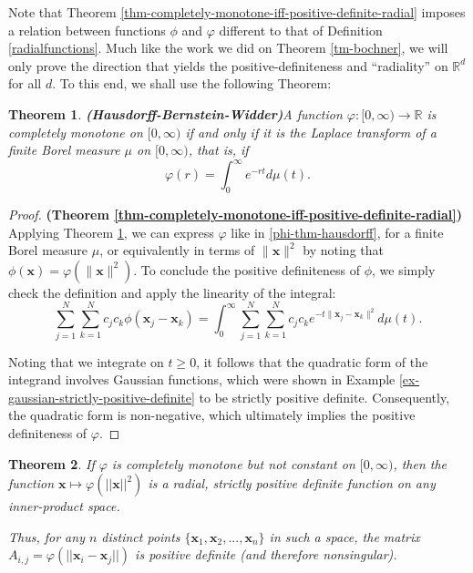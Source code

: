 \documentclass[12pt]{report} %
\newtheorem{theorem}{Theorem}
\newcommand{\tmmathbf}[1]{\ensuremath{\boldsymbol{#1}}}
\newcommand{\tmstrong}[1]{\textbf{#1}}
\begin{document}
Note that Theorem \ref{thm-completely-monotone-iff-positive-definite-radial}
imposes a relation between functions $\phi$ and $\varphi$ different to that of
Definition \ref{radialfunctions}. Much like the work we did on Theorem
\ref{tm-bochner}, we will only prove the direction that yields the
positive-definiteness and ``radiality'' on $\mathbb{R}^d$ for all $d$. To this
end, we shall use the following Theorem:

\begin{theorem}
  {\tmstrong{(Hausdorff-Bernstein-Widder)}}\label{thm-hausdorff-bernstein-widder}
  A function $\varphi : [0, \infty) \rightarrow \mathbb{R}$ is completely
  monotone on $[0, \infty)$ if and only if it is the Laplace transform of a
  finite  Borel measure $\mu$ on $[0, \infty)$, that is, if
  \begin{equation}
    \varphi (r) = \int_0^{\infty} e^{- r t} d \mu (t) .
    \label{phi-thm-hausdorff}
  \end{equation}
\end{theorem}

\begin{proof}
  {\tmstrong{(Theorem
      \ref{thm-completely-monotone-iff-positive-definite-radial})}} Applying
  Theorem \ref{thm-hausdorff-bernstein-widder}, we can express $\varphi$ like
  in \eqref{phi-thm-hausdorff}, for a finite Borel measure $\mu$,
  or equivalently in terms of $\| \tmmathbf{x} \|^2$ by noting that $\phi
    (\tmmathbf{x}) = \varphi (\| \tmmathbf{x} \|^2)$. To conclude the positive
  definiteness of $\phi$, we simply check the definition and apply the
  linearity of the integral:
  \begin{equation}\label{eqn-linearity-of-integral}
    \sum_{j = 1}^N \sum_{k = 1}^N c_j c_k \phi (\tmmathbf{x}_j
    -\tmmathbf{x}_k) = \int_0^{\infty} \sum_{j = 1}^N \sum_{k = 1}^N c_j c_k
    e^{- t \| \tmmathbf{x}_j -\tmmathbf{x}_k \|^2} d \mu (t) .
  \end{equation}

  Noting that we integrate on $t \geq 0$, it follows that the quadratic form of
  the integrand involves Gaussian functions, which were shown in Example
  \ref{ex-gaussian-strictly-positive-definite} to be strictly positive
  definite. Consequently, the quadratic form is non-negative, which ultimately
  implies the positive definiteness of $\varphi$.
\end{proof}

\begin{theorem}
  If $\varphi$ is completely monotone but not constant on $[0,\infty)$,
  then the function ${\tmmathbf{x}} \mapsto \varphi(||\tmmathbf{x}||^2)$ is a radial,
  strictly positive definite function on any inner-product space.

  Thus, for any $n$ distinct points
  $\{\tmmathbf{x}_1,\tmmathbf{x}_2,...,\tmmathbf{x}_n\}$
  in such a space, the matrix
  $A_{i,j}=\varphi(||\tmmathbf{x}_i-\tmmathbf{x}_j||)$ is positive definite
  (and therefore nonsingular).
\end{theorem}
\end{document}
